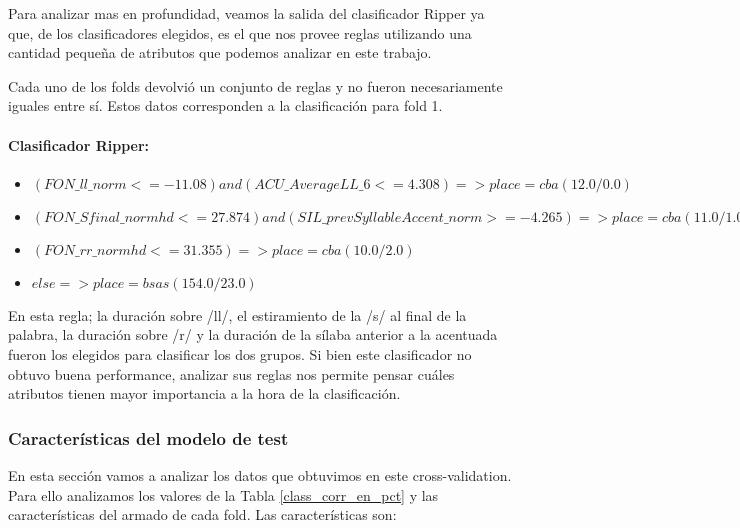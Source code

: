 Para analizar mas en profundidad, veamos la salida del clasificador Ripper ya que, de los clasificadores elegidos, es el que nos provee reglas utilizando una cantidad pequeña de atributos que podemos analizar en este trabajo.

Cada uno de los folds devolvió un conjunto de reglas y no fueron necesariamente iguales entre sí. Estos datos corresponden a la clasificación para fold 1.

\paragraph*{Clasificador Ripper:}

\begin{flushleft}
	\begin{itemize}
		
		\item $(FON\_ll\_norm <= -11.08) and (ACU\_AverageLL\_6 <= 4.308) => place=cba (12.0/0.0)$ \\
		\item $(FON\_Sfinal\_normhd <= 27.874) and (SIL\_prevSyllableAccent\_norm >= -4.265) => place=cba (11.0/1.0)$ \\
		\item $(FON\_rr\_normhd <= 31.355) => place=cba (10.0/2.0)$ \\
		\item $ else  => place=bsas (154.0/23.0)$
	\end{itemize}
\end{flushleft}

En esta regla; la duración sobre /ll/, el estiramiento de la /s/ al final de la palabra, la duración sobre /r/ y la duración de la sílaba anterior a la acentuada fueron los elegidos para clasificar los dos grupos. Si bien este clasificador no obtuvo buena performance, analizar sus reglas nos permite pensar cuáles atributos tienen mayor importancia a la hora de la clasificación.

\subsubsection{Características del modelo de test}

En esta sección vamos a analizar los datos que obtuvimos en este cross-validation. Para ello analizamos los valores de la Tabla \ref{class_corr_en_pct} y las características del armado de cada fold. Las características son:

